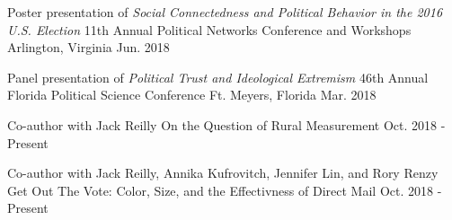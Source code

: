

\begin{cventries}



\cventry
  {Poster presentation of \emph{Social Connectedness and Political Behavior in the 2016 U.S. Election}} %
  {11th Annual Political Networks Conference and Workshops} %
  {Arlington, Virginia} %
  {Jun. 2018} %
  {}


\cventry
  {Panel presentation of \emph{Political Trust and Ideological Extremism}} %
  {46th Annual Florida Political Science Conference} %
  {Ft. Meyers, Florida} %
  {Mar. 2018} %
  {}

\cventry
  {Co-author with Jack Reilly} %
  {On the Question of Rural Measurement} %
  {Oct. 2018 - Present} %
  {} %
  {}


\cventry
  {Co-author with Jack Reilly, Annika Kufrovitch, Jennifer Lin, and Rory Renzy} %
  {Get Out The Vote: Color, Size, and the Effectivness of Direct Mail} %
  {Oct. 2018 - Present} %
  {} %
  {}

\end{cventries}
